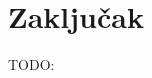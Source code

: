 \documentclass[journal,twocolumn,letterpaper]{IEEEJERM}
\begin{document}

\section{Zaključak}


TODO:

\end{document}
